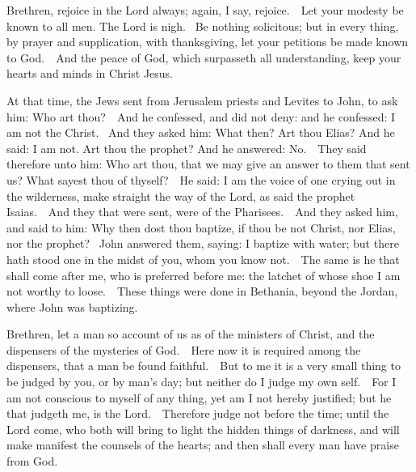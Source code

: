 \begin{multicols}{2}


Brethren, rejoice in the Lord always; again, I say, rejoice.  Let your modesty be known
to all men. The Lord is nigh.   Be nothing solicitous; but in every thing, by
prayer and supplication, with thanksgiving, let your petitions be made known to
God.  And the peace of God, which surpasseth all understanding, keep your
hearts and minds in Christ Jesus.



At that time, %
the Jews sent from Jerusalem priests
and Levites to John, to ask him: Who art thou?  And he confessed, and did not
deny: and he confessed: I am not the Christ.   And they asked him: What then?
Art thou Elias? And he said: I am not. Art thou the prophet? And he answered:
No.  They said therefore unto him: Who art thou, that we may give an answer to
them that sent us? What sayest thou of thyself?  He said: I am the voice of one
crying out in the wilderness, make straight the way of the Lord, as said the
prophet Isaias.  And they that were sent, were of the Pharisees.  And they
asked him, and said to him: Why then dost thou baptize, if thou be not Christ,
nor Elias, nor the prophet?   John answered them, saying: I baptize with water;
but there hath stood one in the midst of you, whom you know not.  The same is
he that shall come after me, who is preferred before me: the latchet of whose
shoe I am not worthy to loose.  These things were done in Bethania, beyond the
Jordan, where John was baptizing. 

\bigskip



Brethren, let a man so account of us as of the ministers of Christ, and the dispensers of
the mysteries of God.  Here now it is required among the dispensers, that a man
be found faithful.  But to me it is a very small thing to be judged by you, or
by man's day; but neither do I judge my own self.  For I am not conscious to
myself of any thing, yet am I not hereby justified; but he that judgeth me, is
the Lord.  Therefore judge not before the time; until the Lord come, who both
will bring to light the hidden things of darkness, and will make manifest the
counsels of the hearts; and then shall every man have praise from God.


\end{multicols}
